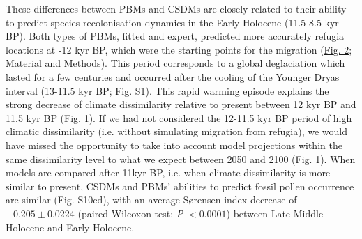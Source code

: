 \documentclass[9pt,twocolumn,twoside]{pnas-new}
\newcommand{\textappr}{\raisebox{0.5ex}{\texttildelow}}
\begin{document}
These differences between PBMs and CSDMs are closely related to their ability to predict species recolonisation dynamics in the Early Holocene (\textappr11.5-8.5 kyr BP). Both types of PBMs, fitted and expert, predicted more accurately refugia locations at -12 kyr BP, which were the starting points for the migration (\hyperref[fig:quercusdeciduoussimulations]{Fig. 2}; Material and Methods). This period corresponds to a global deglaciation which lasted for a few centuries and occurred after the cooling of the Younger Dryas interval  (\textappr13-11.5 kyr BP; Fig. S1). This rapid warming episode explains the strong decrease of climate dissimilarity relative to present between 12 kyr BP and 11.5 kyr BP (\hyperref[fig:climaticdissimilarity]{Fig. 1}). If we had not considered the 12-11.5 kyr BP period of high climatic dissimilarity (i.e. without simulating migration from refugia), we would have missed the opportunity to take into account model projections within the same dissimilarity level to what we expect between 2050 and 2100 (\hyperref[fig:climaticdissimilarity]{Fig. 1}). When models are compared after 11kyr BP, i.e. when climate dissimilarity is more similar to present, CSDMs and PBMs' abilities to predict fossil pollen occurrence are similar (Fig. S10cd), with an average Sørensen index decrease of $-0.205\pm0.0224$ (paired Wilcoxon-test: \emph{P} $<0.0001$) between Late-Middle Holocene and Early Holocene.
\end{document}

